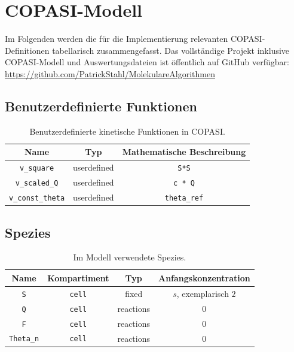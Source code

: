\appendix

\section{COPASI-Modell}

Im Folgenden werden die für die Implementierung relevanten
COPASI-Definitionen tabellarisch zusammengefasst. Das vollständige Projekt
inklusive COPASI-Modell und Auswertungsdateien ist öffentlich auf GitHub
verfügbar: \url{https://github.com/PatrickStahl/MolekulareAlgorithmen}

\subsection{Benutzerdefinierte Funktionen}

\begin{table}[h]
    \centering
    \begin{tabular}{c|c|c}
        Name & Typ & Mathematische Beschreibung \\
        \hline
        \texttt{v\_square} & userdefined & \texttt{S*S} \\
        \texttt{v\_scaled\_Q} & userdefined & \texttt{c * Q} \\
        \texttt{v\_const\_theta} & userdefined & \texttt{theta\_ref} \\
    \end{tabular}
    \caption{Benutzerdefinierte kinetische Funktionen in COPASI.}
    \label{tab:copasi_functions}
\end{table}

\subsection{Spezies}

\begin{table}[h]
    \centering
    \begin{tabular}{c|c|c|c}
        Name & Kompartiment & Typ & Anfangskonzentration \\
        \hline
        \texttt{S} & \texttt{cell} & fixed & \(s\), exemplarisch \(2\) \\
        \texttt{Q} & \texttt{cell} & reactions & \(0\) \\
        \texttt{F} & \texttt{cell} & reactions & \(0\) \\
        \texttt{Theta\_n} & \texttt{cell} & reactions & \(0\) \\
    \end{tabular}
    \caption{Im Modell verwendete Spezies.}
    \label{tab:copasi_species}
\end{table}

